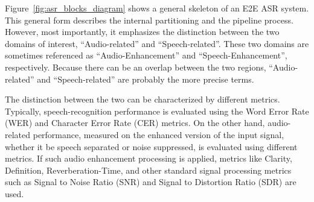 Figure~\ref{fig:asr_blocks_diagram} shows 
a general skeleton of
an E2E ASR system. This general form describes the
internal partitioning and the pipeline process.
However, most importantly, it emphasizes
the distinction between the two domains of interest,
``Audio-related'' and ``Speech-related''.
These two domains are sometimes referenced
as ``Audio-Enhancement'' and ``Speech-Enhancement'', respectively.
Because there can be an overlap between
the two regions, ``Audio-related'' 
and ``Speech-related'' are probably the more precise terms.



The distinction between the two can be characterized
by different metrics.
Typically, speech-recognition performance is evaluated
using the Word Error Rate (WER) and
Character Error Rate (CER) metrics.
On the other hand, audio-related performance,
measured on the enhanced version of the input signal,
whether it be speech separated or noise suppressed,
is evaluated using different metrics.
If such audio enhancement processing is applied,
metrics like Clarity, Definition,
Reverberation-Time, and other standard signal processing metrics
such as Signal to Noise Ratio (SNR) 
and Signal to Distortion Ratio (SDR) are used.






